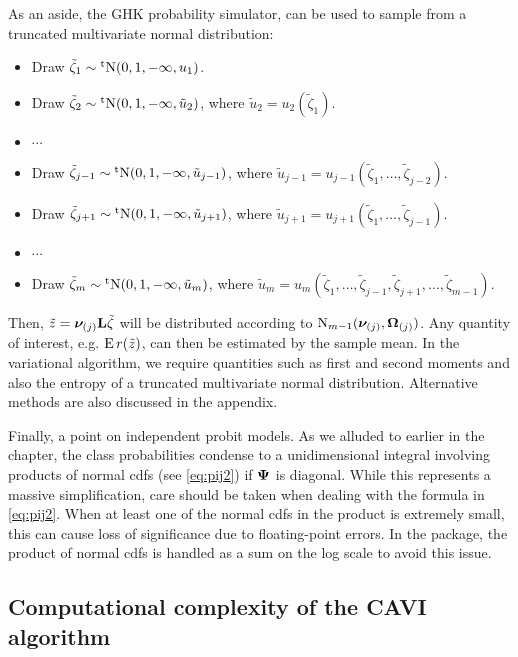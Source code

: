 As an aside, the GHK probability simulator, can be used to sample from a truncated multivariate normal distribution:
\begin{itemize}
  \item Draw $\tilde\zeta_1 \sim \operatorname{{}^tN}(0,1,-\infty,u_1)$.
  \item Draw $\tilde\zeta_2 \sim \operatorname{{}^tN}(0,1,-\infty,\tilde u_2)$, where $\tilde u_2 = u_2(\tilde\zeta_1)$.
  \item $\cdots$
  \item  Draw $\tilde\zeta_{j-1} \sim \operatorname{{}^tN}(0,1,-\infty,\tilde u_{j-1})$, where $\tilde u_{j-1} = u_{j-1}(\tilde\zeta_1,\dots,\tilde\zeta_{j-2})$.
  \item Draw $\tilde\zeta_{j+1} \sim \operatorname{{}^tN}(0,1,-\infty,\tilde u_{j+1})$, where $\tilde u_{j+1} = u_{j+1}(\tilde\zeta_1,\dots,\tilde\zeta_{j-1})$.
  \item $\cdots$
  \item Draw $\tilde\zeta_m \sim \operatorname{{}^tN}(0,1,-\infty,\tilde u_m)$, where $\tilde u_m = u_m(\tilde\zeta_1,\dots,\tilde\zeta_{j-1},\tilde\zeta_{j+1},\dots,\tilde\zeta_{m-1})$.
\end{itemize}
Then, $\tilde z = {\bm\nu}_{(j)} {\mathbf L}\tilde\zeta$ will be distributed according to $\operatorname{N}_{m-1}({\bm\nu}_{(j)},{\bm\Omega}_{(j)})$.
Any quantity of interest, e.g. $\operatorname{E} r(\tilde z)$, can then be estimated by the sample mean.
In the variational algorithm, we require quantities such as first and second moments and also the entropy of a truncated multivariate normal distribution.
Alternative methods are also discussed in the appendix.

Finally, a point on independent probit models.
As we alluded to earlier in the chapter, the class probabilities condense to a unidimensional integral involving products of normal cdfs (see \cref{eq:pij2}) if ${\bm\Psi}$ is diagonal.
While this represents a massive simplification, care should be taken when dealing with the formula in \cref{eq:pij2}.
When at least one of the normal cdfs in the product is extremely small, this can cause loss of significance due to floating-point errors.
In the  package, the product of normal cdfs is handled as a sum on the log scale to avoid this issue.

\subsection{Computational complexity of the CAVI algorithm}
\label{sec:complxiprobit}

